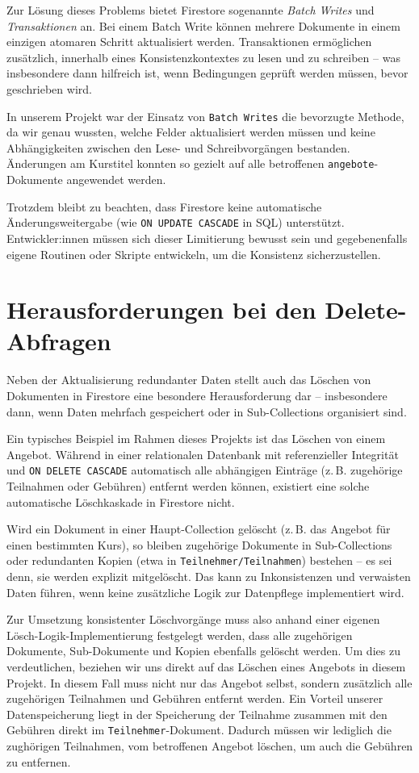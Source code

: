 \documentclass[12pt,a4paper%
              ,oneside     %
              ,titlepage
              ,DIV=13
              ,headinclude
              ,footinclude=false%
              ,cleardoublepage=empty%
              ,parskip=half,
              BCOR=0mm,
              ]{scrreprt}
\begin{document}
Zur Lösung dieses Problems bietet Firestore sogenannte \textit{Batch Writes} und \textit{Transaktionen} an. Bei einem Batch Write können mehrere Dokumente in einem einzigen atomaren Schritt aktualisiert werden. Transaktionen ermöglichen zusätzlich, innerhalb eines Konsistenzkontextes zu lesen und zu schreiben – was insbesondere dann hilfreich ist, wenn Bedingungen geprüft werden müssen, bevor geschrieben wird.

In unserem Projekt war der Einsatz von \texttt{Batch Writes} die bevorzugte Methode, da wir genau wussten, welche Felder aktualisiert werden müssen und keine Abhängigkeiten zwischen den Lese- und Schreibvorgängen bestanden. Änderungen am Kurstitel konnten so gezielt auf alle betroffenen \texttt{angebote}-Dokumente angewendet werden.

Trotzdem bleibt zu beachten, dass Firestore keine automatische Änderungsweitergabe (wie \texttt{ON UPDATE CASCADE} in SQL) unterstützt. Entwickler:innen müssen sich dieser Limitierung bewusst sein und gegebenenfalls eigene Routinen oder Skripte entwickeln, um die Konsistenz sicherzustellen.

\chapter{Herausforderungen bei den Delete-Abfragen}
\label{delete-label}

Neben der Aktualisierung redundanter Daten stellt auch das Löschen von Dokumenten in Firestore eine besondere Herausforderung dar – insbesondere dann, wenn Daten mehrfach gespeichert oder in Sub-Collections organisiert sind.

Ein typisches Beispiel im Rahmen dieses Projekts ist das Löschen von einem Angebot. Während in einer relationalen Datenbank mit referenzieller Integrität und \texttt{ON DELETE CASCADE} automatisch alle abhängigen Einträge (z.\,B. zugehörige Teilnahmen oder Gebühren) entfernt werden können, existiert eine solche automatische Löschkaskade in Firestore nicht.

Wird ein Dokument in einer Haupt-Collection gelöscht (z.\,B. das Angebot für einen bestimmten Kurs), so bleiben zugehörige Dokumente in Sub-Collections oder redundanten Kopien (etwa in \texttt{Teilnehmer/Teilnahmen}) bestehen – es sei denn, sie werden explizit mitgelöscht. Das kann zu Inkonsistenzen und verwaisten Daten führen, wenn keine zusätzliche Logik zur Datenpflege implementiert wird.

Zur Umsetzung konsistenter Löschvorgänge muss also anhand einer eigenen Lösch-Logik-Implementierung festgelegt werden, dass alle zugehörigen Dokumente, Sub-Dokumente und Kopien ebenfalls gelöscht werden. Um dies zu verdeutlichen, beziehen wir uns direkt auf das Löschen eines Angebots in diesem Projekt. In diesem Fall muss nicht nur das Angebot selbst, sondern zusätzlich alle zugehörigen Teilnahmen und Gebühren entfernt werden.
Ein Vorteil unserer Datenspeicherung liegt in der Speicherung der Teilnahme zusammen mit den Gebühren direkt im \texttt{Teilnehmer}-Dokument. Dadurch müssen wir lediglich die zughörigen Teilnahmen, vom betroffenen Angebot löschen, um auch die Gebühren zu entfernen.
\end{document}
